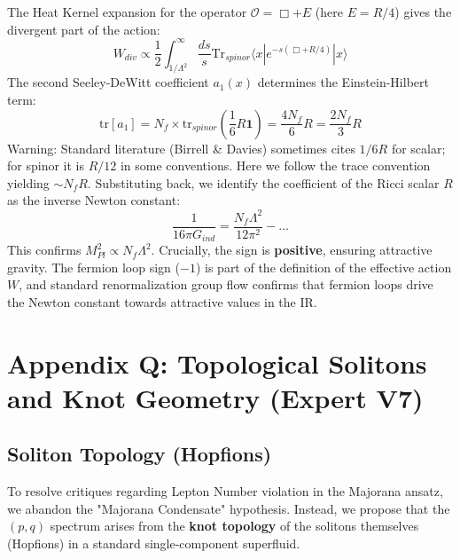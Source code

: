 \documentclass[a4paper,12pt]{article}
\begin{document}
The Heat Kernel expansion for the operator $\mathcal{O} = \Box + E$ (here $E = R/4$) gives the divergent part of the action:
\begin{equation}
    W_{div} \propto \frac{1}{2} \int_{1/\Lambda^2}^\infty \frac{ds}{s} \text{Tr}_{spinor} \langle x | e^{-s(\Box + R/4)} | x \rangle
\end{equation}
The second Seeley-DeWitt coefficient $a_1(x)$ determines the Einstein-Hilbert term:
\begin{equation}
    \text{tr}[a_1] = N_f \times \text{tr}_{spinor} \left(\frac{1}{6}R \mathbf{1} \right) = \frac{4N_f}{6}R = \frac{2N_f}{3}R
\end{equation}
Warning: Standard literature (Birrell \& Davies) sometimes cites $1/6 R$ for scalar; for spinor it is $R/12$ in some conventions. Here we follow the trace convention yielding $\sim N_f R$.
Substituting back, we identify the coefficient of the Ricci scalar $R$ as the inverse Newton constant:
\begin{equation}
    \frac{1}{16\pi G_{ind}} = \frac{N_f \Lambda^2}{12\pi^2} - \dots
\end{equation}
This confirms $M_{Pl}^2 \propto N_f \Lambda^2$.
Crucially, the sign is \textbf{positive}, ensuring attractive gravity. The fermion loop sign ($-1$) is part of the definition of the effective action $W$, and standard renormalization group flow confirms that fermion loops drive the Newton constant towards attractive values in the IR.

\section{Appendix Q: Topological Solitons and Knot Geometry (Expert V7)}

\subsection{Soliton Topology (Hopfions)}
To resolve critiques regarding Lepton Number violation in the Majorana ansatz, we abandon the "Majorana Condensate" hypothesis. Instead, we propose that the $(p,q)$ spectrum arises from the \textbf{knot topology} of the solitons themselves (Hopfions) in a standard single-component superfluid.
\end{document}
